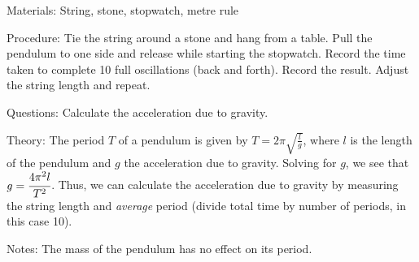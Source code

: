 \begin{multicols}{2}
\begin{description*}
\item[Materials:]{String, stone, stopwatch, metre rule}
\item[Procedure:]{Tie the string around a stone and hang from a table. Pull the pendulum to one side and release while starting the stopwatch. Record the time taken to complete 10 full oscillations (back and forth). Record the result. Adjust the string length and repeat.}
\item[Questions:]{Calculate the acceleration due to gravity.}
\item[Theory:]{The period $T$ of a pendulum is given by $T = 2\pi\sqrt{\frac{l}{g}}$, where $l$ is the length of the pendulum and $g$ the acceleration due to gravity. Solving for $g$, we see that $g = \cfrac{4\pi^2l}{T^2}$. Thus, we can calculate the acceleration due to gravity by measuring the string length and \emph{average} period (divide total time by number of periods, in this case 10).}
\item[Notes:]{The mass of the pendulum has no effect on its period.}
\end{description*}






\end{multicols}

\pagebreak